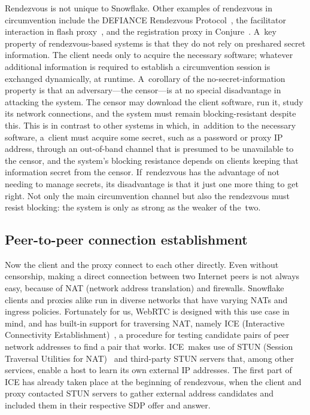 \documentclass[letterpaper,twocolumn]{article}
\begin{document}
Rendezvous is not unique to Snowflake.
Other examples of rendezvous in circumvention include
the DEFIANCE Rendezvous Protocol~\cite[\S 3]{Lincoln2012a},
the facilitator interaction in flash proxy~\cite[\S 3]{Fifield2012a},
and the registration proxy in Conjure~\cite[\S 4.1]{Frolov2019b}.
A~key property of rendezvous-based systems
is that they do not rely on preshared secret information.
The client needs only to acquire the necessary software;
whatever additional information is required to establish a circumvention session
is exchanged dynamically, at runtime.
A~corollary of the no-secret-information property
is that an adversary---the censor---is
at no special disadvantage in attacking the system.
The censor may download the client software,
run it, study its network connections,
and the system must remain blocking-resistant despite this.
This is in contrast to other systems in which,
in~addition to the necessary software,
a~client must acquire some secret,
such as a password or proxy IP address,
through an out-of-band channel
that is presumed to be unavailable to the censor,
and the system's blocking resistance depends on
clients keeping that information secret from the censor.
If~rendezvous has the advantage of not needing to manage secrets,
its disadvantage is that it just one more thing to get right.
Not only the main circumvention channel
but also the rendezvous must resist blocking:
the system is only as strong as the weaker of the~two.

\subsection{Peer-to-peer connection establishment}
\label{sec:ice}

Now the client and the proxy connect to each other directly.
Even without censorship,
making a direct connection between two Internet peers is not always easy,
because of NAT (network address translation) and firewalls.
Snowflake clients and proxies alike run in diverse networks
that have varying NATs and ingress policies.
Fortunately for us,
WebRTC is designed with this use case in mind,
and has built-in support for traversing NAT, namely
ICE (Interactive Connectivity Establishment)~\cite{rfc8445},
a procedure for testing candidate pairs of peer network addresses
to find a pair that works.
ICE~makes use of
STUN (Session Traversal Utilities for NAT)~\cite{rfc8489}
and third-party STUN servers that, among other services,
enable a host to learn its own external IP addresses.
The first part of ICE has already taken place at the beginning of rendezvous,
when the client and proxy contacted STUN servers to gather
external address candidates and included them in their respective
SDP offer and answer.
\end{document}
